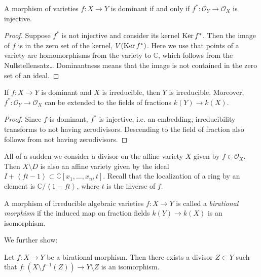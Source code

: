 \begin{proposition}
\label{proposition-domin-iff-induc-map}
A morphism of varieties $f:X \to Y$
is dominant if and only if
$f^*:\mathcal{O}_Y \to \mathcal{O}_X$ is
injective.
\end{proposition}

\begin{proof}
Suppose $f^*$ is not injective and
consider its kernel $\mathop{\mathrm{Ker}} f^*$.
Then the image of $f$ is in the zero set of
the kernel,
$V(\mathop{\mathrm{Ker}} f^*)$.
Here we use that points of a variety are
homomorphisms from the variety to
$\mathbb{C}$,
which follows from the Nullstellensatz…
Dominantness means that the image is not
contained in
the zero set of an ideal.
\end{proof}

\begin{lemma}
\label{lemma-dominant-morphism-irreducible}
If $f:X \to Y$ is dominant and $X$ is
irreducible, then $Y$ is irreducible.
Moreover, $f^*:\mathcal{O}_Y \to
\mathcal{O}_X$ can be extended to the fields
of fractions $k(Y) \to k(X)$.
\end{lemma}

\begin{proof}
Since $f$ is dominant, $f^*$ is injective,
i.e. an embedding,
irreducibility transforms to not having
zerodivisors.
Descending to the field of fraction also
follows from not having zerodivisors.
\end{proof}

\begin{remark}
\label{remark-divisor}
All of a sudden we consider a divisor on the
affine variety $X$
given by $f \in \mathcal{O}_X$.
Then $X\setminus D$ is also an affine variety
given by the ideal
$I+\left\langle{}ft-1\right\rangle{} \subset
\mathbb{C}[x_1,…,x_n,t]$.
Recall that the localization of a ring by an
element is
$\mathbb{C}/\left\langle{}1-ft\right\rangle{}$, where $t$ is
the inverse of $f$.
\end{remark}

\begin{definition}
\label{definition-birational-morphism}
A morphism of irreducible algebraic varieties
$f:X \to Y$ is called a
{\it birational morphism} if
the induced map on fraction fields
$k(Y) \to k(X)$ is an isomorphism.
\end{definition}

\noindent
We further show:

\begin{proposition}
\label{proposition-birat-then-isomo-away}
Let $f:X \to Y$ be a birational morphism.
Then there exists a divisor $Z \subset Y$
such that $f:(X \setminus f^{-1}(Z)) \to Y
\setminus Z$
is an isomorphism.
\end{proposition}

